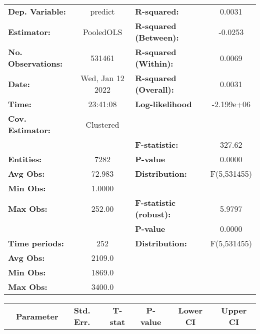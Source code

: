 \begin{center}
\begin{tabular}{lclc}
\toprule
\textbf{Dep. Variable:}    &      predict       & \textbf{  R-squared:         }   &      0.0031      \\
\textbf{Estimator:}        &     PooledOLS      & \textbf{  R-squared (Between):}  &     -0.0253      \\
\textbf{No. Observations:} &       531461       & \textbf{  R-squared (Within):}   &      0.0069      \\
\textbf{Date:}             &  Wed, Jan 12 2022  & \textbf{  R-squared (Overall):}  &      0.0031      \\
\textbf{Time:}             &      23:41:08      & \textbf{  Log-likelihood     }   &    -2.199e+06    \\
\textbf{Cov. Estimator:}   &     Clustered      & \textbf{                     }   &                  \\
\textbf{}                  &                    & \textbf{  F-statistic:       }   &      327.62      \\
\textbf{Entities:}         &        7282        & \textbf{  P-value            }   &      0.0000      \\
\textbf{Avg Obs:}          &       72.983       & \textbf{  Distribution:      }   &   F(5,531455)    \\
\textbf{Min Obs:}          &       1.0000       & \textbf{                     }   &                  \\
\textbf{Max Obs:}          &       252.00       & \textbf{  F-statistic (robust):} &      5.9797      \\
\textbf{}                  &                    & \textbf{  P-value            }   &      0.0000      \\
\textbf{Time periods:}     &        252         & \textbf{  Distribution:      }   &   F(5,531455)    \\
\textbf{Avg Obs:}          &       2109.0       & \textbf{                     }   &                  \\
\textbf{Min Obs:}          &       1869.0       & \textbf{                     }   &                  \\
\textbf{Max Obs:}          &       3400.0       & \textbf{                     }   &                  \\
\bottomrule
\end{tabular}
\begin{tabular}{lcccccc}
                & \textbf{Parameter} & \textbf{Std. Err.} & \textbf{T-stat} & \textbf{P-value} & \textbf{Lower CI} & \textbf{Upper CI}  \\

\end{tabular}
\end{center}
